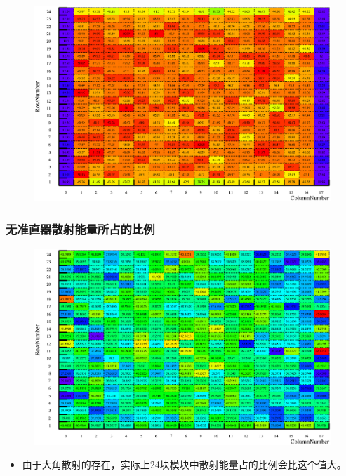 \documentclass{beamer}
\newcommand{\liuhao}{\fontsize{7.875pt}{\baselineskip}\selectfont}
\begin{document}
\begin{CJK*}{UTF8}{gkai}
\begin{frame}
\begin{minipage}[t]{0.7\textwidth}
\begin{figure}[ht]
        \includegraphics[width=\textwidth,height=0.58\textwidth]{WithoutCollimatorScatteringEnergyMerged.eps}
      \end{figure}
    \end{minipage}
  \end{frame}
  \begin{frame}\frametitle{无准直器散射能量所占的比例}
    \begin{figure}[ht]
      \centering
      \includegraphics[width=\textwidth]{WithoutCollimatorScatteringRatioMerged.eps}
    \end{figure}
    \liuhao
    \vskip -1cm
    \begin{itemize}
      \item 由于大角散射的存在，实际上24块模块中散射能量占的比例会比这个值大。
    \end{itemize}
  \end{frame}

\end{CJK*}
\end{document}
